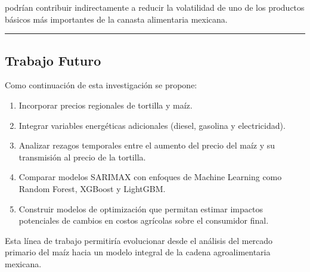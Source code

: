 \documentclass[11pt]{article}
\makeatletter
\providecommand{\tightlist}{%
      \setlength{\itemsep}{0pt}\setlength{\parskip}{0pt}}
\newcommand{\boxspacing}{\kern\kvtcb@left@rule\kern\kvtcb@boxsep}
\newcommand{\prompt}[4]{
        {\ttfamily\llap{{\color{#2}[#3]:\hspace{3pt}#4}}\vspace{-\baselineskip}}
    }
\makeatother
\begin{document}
podrían contribuir indirectamente a reducir la volatilidad de uno de los
productos básicos más importantes de la canasta alimentaria mexicana.

\begin{center}\rule{0.5\linewidth}{0.5pt}\end{center}

\hypertarget{trabajo-futuro}{%
\subsection{Trabajo Futuro}\label{trabajo-futuro}}

Como continuación de esta investigación se propone:

\begin{enumerate}
\def\labelenumi{\arabic{enumi}.}
\tightlist
\item
  Incorporar precios regionales de tortilla y maíz.
\item
  Integrar variables energéticas adicionales (diesel, gasolina y
  electricidad).
\item
  Analizar rezagos temporales entre el aumento del precio del maíz y su
  transmisión al precio de la tortilla.
\item
  Comparar modelos SARIMAX con enfoques de Machine Learning como Random
  Forest, XGBoost y LightGBM.
\item
  Construir modelos de optimización que permitan estimar impactos
  potenciales de cambios en costos agrícolas sobre el consumidor final.
\end{enumerate}

Esta línea de trabajo permitiría evolucionar desde el análisis del
mercado primario del maíz hacia un modelo integral de la cadena
agroalimentaria mexicana.

    \begin{tcolorbox}[breakable, size=fbox, boxrule=1pt, pad at break*=1mm,colback=cellbackground, colframe=cellborder]
\prompt{In}{incolor}{ }{\boxspacing}
\begin{Verbatim}[commandchars=\\\{\}]

\end{Verbatim}
\end{tcolorbox}


    
    
    
\end{document}
